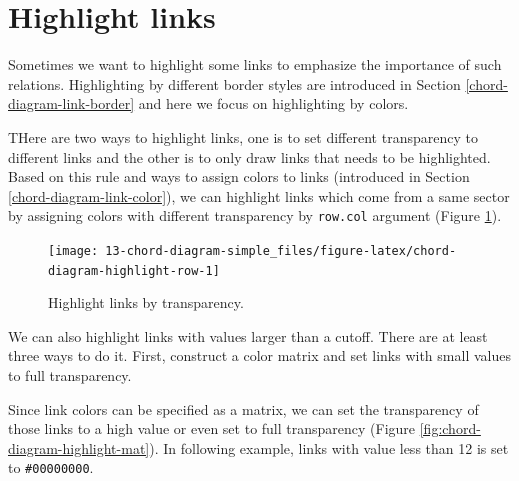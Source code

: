 \documentclass[]{book}
\newenvironment{Shaded}{\begin{snugshade}}{\end{snugshade}}
\newcommand{\KeywordTok}[1]{\textcolor[rgb]{0.13,0.29,0.53}{\textbf{#1}}}
\newcommand{\DataTypeTok}[1]{\textcolor[rgb]{0.13,0.29,0.53}{#1}}
\newcommand{\DecValTok}[1]{\textcolor[rgb]{0.00,0.00,0.81}{#1}}
\newcommand{\StringTok}[1]{\textcolor[rgb]{0.31,0.60,0.02}{#1}}
\newcommand{\OperatorTok}[1]{\textcolor[rgb]{0.81,0.36,0.00}{\textbf{#1}}}
\newcommand{\NormalTok}[1]{#1}
\begin{document}
\section{Highlight links}\label{highlight-links}

Sometimes we want to highlight some links to emphasize the importance of
such relations. Highlighting by different border styles are introduced
in Section \ref{chord-diagram-link-border} and here we focus on
highlighting by colors.

THere are two ways to highlight links, one is to set different
transparency to different links and the other is to only draw links that
needs to be highlighted. Based on this rule and ways to assign colors to
links (introduced in Section \ref{chord-diagram-link-color}), we can
highlight links which come from a same sector by assigning colors with
different transparency by \texttt{row.col} argument (Figure
\ref{fig:chord-diagram-highlight-row}).

\begin{Shaded}
\end{Shaded}

\begin{figure}

{\centering \texttt{[image: 13-chord-diagram-simple\_files/figure-latex/chord-diagram-highlight-row-1]} 

}

\caption{Highlight links by transparency.}\label{fig:chord-diagram-highlight-row}
\end{figure}

We can also highlight links with values larger than a cutoff. There are
at least three ways to do it. First, construct a color matrix and set
links with small values to full transparency.

Since link colors can be specified as a matrix, we can set the
transparency of those links to a high value or even set to full
transparency (Figure \ref{fig:chord-diagram-highlight-mat}). In
following example, links with value less than 12 is set to
\texttt{\#00000000}.

\begin{Shaded}
\end{Shaded}
\end{document}
